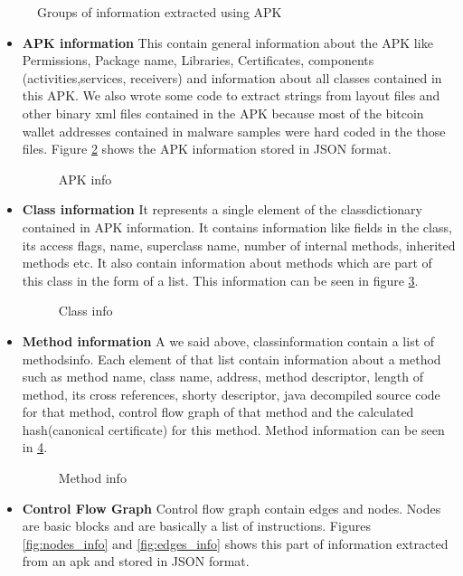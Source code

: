 \documentclass[../main.tex]{subfile}
\begin{document}
		\begin{figure}[H]
			\centering
			\caption{Groups of information extracted using APK}
			\label{fig:info_extracted}
		\end{figure}
		
		
		\begin{itemize}
			\item \textbf{APK information} This contain general information about the APK like Permissions, Package name, Libraries, Certificates, components (activities,services, receivers) and information about all classes contained in this APK. We also wrote some code to extract strings from layout files and other binary xml files contained in the APK because most of the bitcoin wallet addresses contained in malware samples were hard coded in the those files. Figure \ref{fig:apk_info} shows the APK information stored in JSON format.
			\begin{figure}[H]
				\centering
				\caption{APK info}
				\label{fig:apk_info}	
			\end{figure}
			
			\item \textbf{Class information} It represents a single element of the class\textunderscore dictionary contained in APK information. It contains information like fields in the class, its access flags, name, superclass name, number of internal methods, inherited methods etc. It also contain information about methods which are part of this class in the form of a list. This information can be seen in figure \ref{fig:class_info}.
			\begin{figure}[H]
				\centering
				\caption{Class info}
				\label{fig:class_info}	
			\end{figure}
			
			
			\item \textbf{Method information} A we said above, class\textunderscore information contain a list of methods\textunderscore info. Each element of that list contain information about a method such as method name, class name, address, method descriptor, length of method, its cross references, shorty descriptor, java decompiled source code for that method, control flow graph of that method and the calculated hash(canonical certificate) for this method. Method information can be seen in \ref{fig:method_info}.
			\begin{figure}[H]
				\centering
				\caption{Method info}
				\label{fig:method_info}	
			\end{figure}
			\item \textbf{Control Flow Graph} Control flow graph contain edges and nodes. Nodes are basic blocks and are basically a list of instructions. Figures \ref{fig:nodes_info} and \ref{fig:edges_info} shows this part of information extracted from an apk and stored in JSON format.


\end{itemize}
\end{document}
